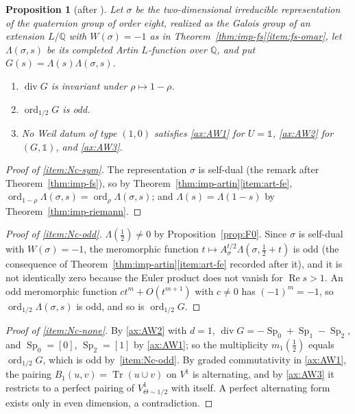 \documentclass[11pt]{amsart}
\theoremstyle{plain}
\newtheorem{proposition}[theorem]{Proposition}
\theoremstyle{definition}
\theoremstyle{remark}
\numberwithin{equation}{section}
\newcommand{\Q}{\mathbb{Q}}
\DeclareMathOperator{\Tr}{Tr}
\DeclareMathOperator{\divisor}{div}
\DeclareMathOperator{\Rea}{Re}
\DeclareMathOperator{\ord}{ord}
\renewcommand{\Re}{\Rea}
\begin{document}
\begin{proposition}[{after \cite[2.9, p.~4, and Theorem~2.13, p.~5]%
{Deninger2022NoWeil}}]\label{prop:N-central-order}
Let $\sigma$ be the two-dimensional irreducible representation of the
quaternion group of order eight, realized as the Galois group of an
extension $L/\Q$ with $W(\sigma)=-1$ as in
Theorem~\ref{thm:imp-fs}\ref{item:fs-omar}, let $\Lambda(\sigma,s)$
be its completed Artin $L$-function over $\Q$, and put
$G(s)=\Lambda(s)\Lambda(\sigma,s)$.
\begin{enumerate}[label=(\roman*)]
\item\label{item:Nc-sym} $\divisor G$ is invariant under
  $\rho\mapsto1-\rho$.
\item\label{item:Nc-odd} $\ord_{1/2}G$ is odd.
\item\label{item:Nc-none} No Weil datum of type $(1,0)$ satisfies
  \ref{ax:AW1} for $U=\mathbb 1$, \ref{ax:AW2} for $(G,\mathbb 1)$, and
  \ref{ax:AW3}.
\end{enumerate}
\end{proposition}

\begin{proof}[Proof of \ref{item:Nc-sym}]
The representation $\sigma$ is self-dual (the remark after
Theorem~\ref{thm:imp-fs}), so by
Theorem~\ref{thm:imp-artin}\ref{item:art-fe},
$\ord_{1-\rho}\Lambda(\sigma,s)=\ord_\rho\Lambda(\sigma,s)$; and
$\Lambda(s)=\Lambda(1-s)$ by Theorem~\ref{thm:imp-riemann}.
\end{proof}

\begin{proof}[Proof of \ref{item:Nc-odd}]
$\Lambda(\tfrac12)\ne0$ by Proposition~\ref{prop:F0}. Since $\sigma$
is self-dual with $W(\sigma)=-1$, the meromorphic function
$t\mapsto A_\sigma^{t/2}\Lambda(\sigma,\tfrac12+t)$ is odd (the
consequence of Theorem~\ref{thm:imp-artin}\ref{item:art-fe} recorded
after it), and it is not identically zero because the Euler product
does not vanish for $\Re s>1$. An odd meromorphic function
$ct^m+O(t^{m+1})$ with $c\ne0$ has $(-1)^m=-1$, so
$\ord_{1/2}\Lambda(\sigma,s)$ is odd, and so is $\ord_{1/2}G$.
\end{proof}

\begin{proof}[Proof of \ref{item:Nc-none}]
By \ref{ax:AW2} with $d=1$, $\divisor G=-\operatorname{Sp}_0+
\operatorname{Sp}_1-\operatorname{Sp}_2$, and $\operatorname{Sp}_0=[0]$,
$\operatorname{Sp}_2=[1]$ by \ref{ax:AW1}; so the multiplicity
$m_1(\tfrac12)$ equals $\ord_{1/2}G$, which is odd
by~\ref{item:Nc-odd}. By graded commutativity in \ref{ax:AW1}, the
pairing $B_1(u,v)=\Tr(u\cup v)$ on $V^1$ is alternating, and by
\ref{ax:AW3} it restricts to a perfect pairing of
$V^1_{\Theta\sim1/2}$ with itself. A perfect alternating form exists
only in even dimension, a contradiction.
\end{proof}
\end{document}
